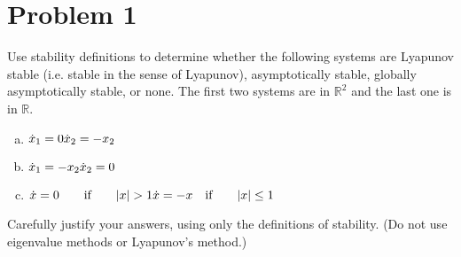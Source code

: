 \documentclass[11pt]{report}
\theoremstyle{definition}
\begin{document}
\section*{Problem 1}
Use stability definitions to determine whether the following systems are Lyapunov stable (i.e. stable in the sense of Lyapunov), asymptotically stable, globally asymptotically stable, or none. The first two systems are in $\mathbb{R}^2$ and the last one is in $\mathbb{R}$.
\begin{multicols}{2}
\begin{enumerate}[(a), noitemsep]
\item $ \dot x_1 = 0 \\ \dot x_2 = -x_2 $
\item $ \dot x_1 = -x_2 \\ \dot x_2 = 0 \\$
\item $ \dot x = 0 \qquad \textrm{if} \qquad |x| > 1 \\ \dot x = -x \quad \textrm{if} \qquad |x| \le 1  $
\end{enumerate}
\end{multicols}
\justify
Carefully justify your answers, using only the definitions of stability. (Do not use eigenvalue methods or Lyapunov’s method.)

\end{document}
